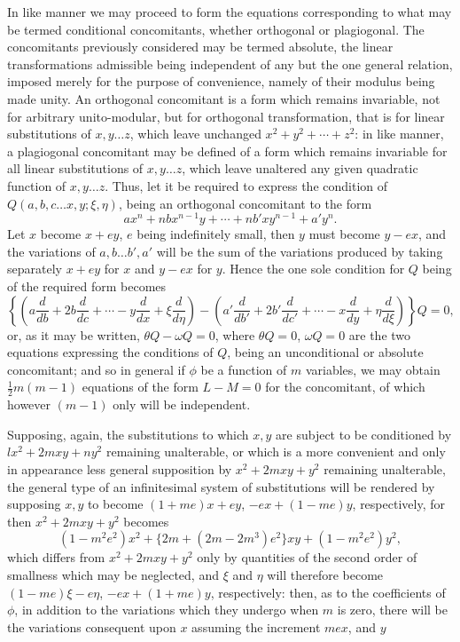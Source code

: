 \documentclass[11pt]{article}
\newcommand{\sourcepage}[1]{\marginpar{\scriptsize p.~#1}}
\begin{document}
\sourcepage{357}
In like manner we may proceed to form the equations corresponding to what may be termed conditional concomitants, whether orthogonal or plagiogonal. The concomitants previously considered may be termed absolute, the linear transformations admissible being independent of any but the one general relation, imposed merely for the purpose of convenience, namely of their modulus being made unity. An orthogonal concomitant is a form which remains invariable, not for arbitrary unito-modular, but for orthogonal transformation, that is for linear substitutions of $x,y\ldots z$, which leave unchanged $x^2+y^2+\cdots+z^2$: in like manner, a plagiogonal concomitant may be defined of a form which remains invariable for all linear substitutions of $x,y\ldots z$, which leave unaltered any given quadratic function of $x,y\ldots z$. Thus, let it be required to express the condition of $Q(a,b,c\ldots x,y;\xi,\eta)$, being an orthogonal concomitant to the form
\[
ax^n+nbx^{n-1}y+\cdots+nb'xy^{n-1}+a'y^n.
\]
Let $x$ become $x+ey$, $e$ being indefinitely small, then $y$ must become $y-ex$, and the variations of $a,b\ldots b',a'$ will be the sum of the variations produced by taking separately $x+ey$ for $x$ and $y-ex$ for $y$. Hence the one sole condition for $Q$ being of the required form becomes
\[
\left\{
\left(a\frac{d}{db}+2b\frac{d}{dc}+\cdots-y\frac{d}{dx}+\xi\frac{d}{d\eta}\right)
-
\left(a'\frac{d}{db'}+2b'\frac{d}{dc'}+\cdots-x\frac{d}{dy}+\eta\frac{d}{d\xi}\right)
\right\}Q=0,
\]
or, as it may be written, $\theta Q-\omega Q=0$, where $\theta Q=0$, $\omega Q=0$ are the two equations expressing the conditions of $Q$, being an unconditional or absolute concomitant; and so in general if $\phi$ be a function of $m$ variables, we may obtain $\frac12m(m-1)$ equations of the form $L-M=0$ for the concomitant, of which however $(m-1)$ only will be independent.

Supposing, again, the substitutions to which $x,y$ are subject to be conditioned by $lx^2+2mxy+ny^2$ remaining unalterable, or which is a more convenient and only in appearance less general supposition by $x^2+2mxy+y^2$ remaining unalterable, the general type of an infinitesimal system of substitutions will be rendered by supposing $x,y$ to become $(1+me)x+ey$, $-ex+(1-me)y$, respectively, for then $x^2+2mxy+y^2$ becomes
\[
(1-m^2e^2)x^2+\{2m+(2m-2m^3)e^2\}xy+(1-m^2e^2)y^2,
\]
which differs from $x^2+2mxy+y^2$ only by quantities of the second order of smallness which may be neglected, and $\xi$ and $\eta$ will therefore become $(1-me)\xi-e\eta$, $-ex+(1+me)y$, respectively: then, as to the coefficients of $\phi$, in addition to the variations which they undergo when $m$ is zero, there will be the variations consequent upon $x$ assuming the increment $mex$, and $y$
\end{document}
